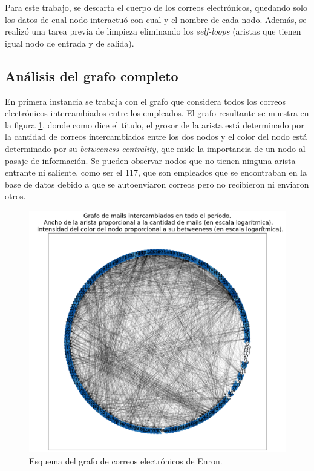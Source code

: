 \documentclass{article}
\begin{document}
Para este trabajo, se descarta el cuerpo de los correos electrónicos, quedando solo los datos de cual nodo interactuó con cual y el nombre de cada nodo. Además, se realizó una tarea previa de limpieza eliminando los \textit{self-loops} (aristas que tienen igual nodo de entrada y de salida).


\subsection{Análisis del grafo completo}
En primera instancia se trabaja con el grafo que considera todos los correos electrónicos intercambiados entre los empleados. El grafo resultante se muestra en la figura \ref{fig:grafo}, donde como dice el título, el grosor de la arista está determinado por la cantidad de correos intercambiados entre los dos nodos y el color del nodo está determinado por su \textit{betweeness centrality}, que mide la importancia de un nodo al pasaje de información. Se pueden observar nodos que no tienen ninguna arista entrante ni saliente, como ser el 117, que son empleados que se encontraban en la base de datos debido a que se autoenviaron correos pero no recibieron ni enviaron otros.

\begin{figure}[htb]
    \centering
    \includegraphics[width=0.8\linewidth]{imagenes/ej1/grafo.png}
    \caption{Esquema del grafo de correos electrónicos de Enron.}
    \label{fig:grafo}
\end{figure}
\end{document}
